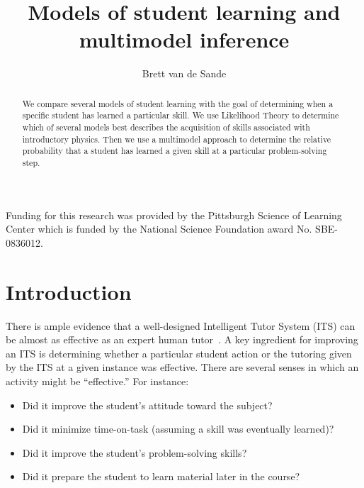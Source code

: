 \documentclass{acmlarge-edm}
\begin{document}
\title{Models of student learning and multimodel inference}
\author{Brett van de Sande
}

%

\begin{abstract}
We compare several models of student learning with the goal of 
determining when a specific student has learned a particular skill.  
We use Likelihood Theory to determine
which of several models best describes the acquisition
of skills associated with introductory physics.  Then we
use a multimodel approach to determine the relative probability
that a student has learned a given skill at a particular 
problem-solving step.
\end{abstract}





\begin{bottomstuff}
Funding for this research was provided by the Pittsburgh Science of
Learning Center which is funded by the National Science Foundation
award No. SBE-0836012.
\end{bottomstuff}


\maketitle


\section{Introduction}


There is ample evidence that a well-designed Intelligent Tutor 
System (ITS) can be almost as effective as an expert human 
tutor~\cite{vanlehn_relative_2011}.  A key ingredient for improving an ITS is
determining whether a particular student action or the 
tutoring given by the ITS at a given instance was effective.
There are several senses in which an activity might be ``effective.''
For instance:  
%
\begin{itemize}
\item Did it improve the student's attitude toward
the subject?  
\item Did it minimize time-on-task (assuming 
a skill was eventually learned)?  
\item Did it improve the student's 
problem-solving skills?  
\item Did it prepare the student to learn
material later in the course?
\end{itemize}
\end{document}
